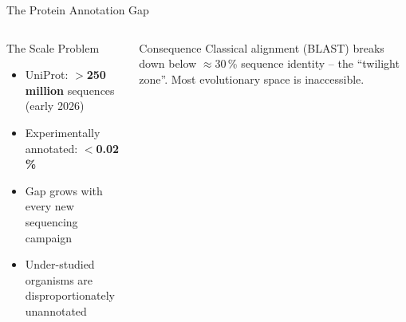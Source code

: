 \documentclass[12pt, aspectratio=169]{beamer}
\begin{document}

\begin{frame}{The Protein Annotation Gap}
  \begin{columns}[c]
      \begin{block}{The Scale Problem}
        \begin{itemize}
          \item UniProt: \textbf{$>$250 million} sequences (early 2026)
          \item Experimentally annotated: \textbf{$<$0.02\,\%}
          \item Gap grows with every new sequencing campaign
          \item Under-studied organisms are disproportionately unannotated
        \end{itemize}
      \end{block}
      \vspace{0.5em}
      \begin{alertblock}{Consequence}
        Classical alignment (BLAST) breaks down below
        $\approx$30\,\% sequence identity -- the ``twilight zone''.
        Most evolutionary space is inaccessible.
      \end{alertblock}
      \centering
  \end{columns}
\end{frame}
\end{document}
